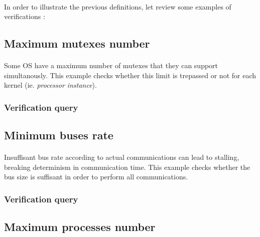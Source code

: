 \paragraph{}
In order to illustrate the previous definitions, let review 
some examples of verifications :

\subsection {Maximum mutexes number}

\paragraph{}
Some OS have a maximum number of mutexes that they can 
support simultanously. This example checks whether this limit 
is trepassed or not for each kernel (ie. \textit{processor 
instance}).

\subsubsection {Verification query}
\paragraph{}


\subsection {Minimum buses rate}

\paragraph{}
Insuffisant bus rate according to actual communications can 
lead to stalling, breaking determinism in communication time.
This example checks whether the bus size is suffisant in 
order to perform all communications.

\subsubsection {Verification query}
\paragraph{}


\subsection {Maximum processes number}

